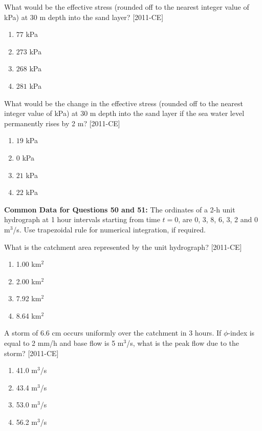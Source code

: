     \item What would be the effective stress (rounded off to the nearest integer value of kPa) at 30 m depth into the sand layer? \hfill{[2011-CE]}
    \begin{enumerate}
        \item $77$ kPa
        \item $273$ kPa
        \item $268$ kPa
        \item $281$ kPa
    \end{enumerate}

    \item What would be the change in the effective stress (rounded off to the nearest integer value of kPa) at 30 m depth into the sand layer if the sea water level permanently rises by 2 m? \hfill{[2011-CE]}
    \begin{enumerate}
        \item $19$ kPa
        \item $0$ kPa
        \item $21$ kPa
        \item $22$ kPa
    \end{enumerate}

    \textbf{Common Data for Questions 50 and 51:}
    The ordinates of a 2-h unit hydrograph at 1 hour intervals starting from time $t = 0$, are 0, 3, 8, 6, 3, 2 and 0 m$^3$/s. Use trapezoidal rule for numerical integration, if required.

    \item What is the catchment area represented by the unit hydrograph? \hfill{[2011-CE]}
    \begin{enumerate}
    \item 1.00 km$^2$
    \item 2.00 km$^2$
    \item 7.92 km$^2$
    \item 8.64 km$^2$
    \end{enumerate}

    \item A storm of 6.6 cm occurs uniformly over the catchment in 3 hours. If $\phi$-index is equal to 2 mm/h and base flow is 5 m$^3$/s, what is the peak flow due to the storm? \hfill{[2011-CE]}
    \begin{enumerate}
    \item 41.0 m$^3$/s
    \item 43.4 m$^3$/s
    \item 53.0 m$^3$/s
    \item 56.2 m$^3$/s
    \end{enumerate}


